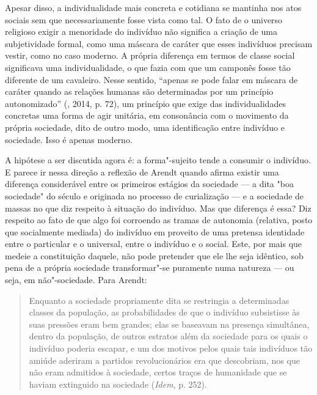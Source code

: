 Apesar disso, a individualidade mais concreta e cotidiana se mantinha
nos atos sociais sem que necessariamente fosse vista como tal. O fato de
o universo religioso exigir a menoridade do indivíduo não significa a
criação de uma subjetividade formal, como uma máscara de caráter que
esses indivíduos precisam vestir, como no caso moderno. A própria
diferença em termos de classe social significava uma individualidade, o
que fazia com que um camponês fosse tão diferente de um cavaleiro. Nesse
sentido, ``apenas se pode falar em máscara de caráter quando as relações
humanas são determinadas por um princípio autonomizado'' (, 2014, p.
72), um princípio que exige das individualidades concretas uma forma de
agir unitária, em consonância com o movimento da própria sociedade, dito
de outro modo, uma identificação entre indivíduo e sociedade. Isso é
apenas moderno.

A hipótese a ser discutida agora é: a
forma"-sujeito tende a consumir o indivíduo. E parece ir nessa direção a
reflexão de Arendt quando afirma existir uma diferença considerável
entre os primeiros estágios da sociedade --- a dita "boa sociedade" do século
 e  originada no processo de curialização ---
e a sociedade de massas no que diz respeito à situação do indivíduo. Mas que
diferença é essa? Diz respeito ao fato de que algo foi corroendo as tramas de
autonomia (relativa, posto que socialmente mediada) do indivíduo em
proveito de uma pretensa identidade entre o particular e o universal,
entre o indivíduo e o social. Este, por mais que medeie a constituição
daquele, não pode pretender que ele lhe seja idêntico, sob pena de a
própria sociedade transformar"-se puramente numa natureza --- ou seja, em
não"-sociedade. Para Arendt:

\begin{quote}
Enquanto a sociedade propriamente dita se restringia a determinadas
classes da população, as probabilidades de que o indivíduo subsistisse
às suas pressões eram bem grandes; elas se baseavam na presença
simultânea, dentro da população, de outros estratos além da sociedade
para os quais o indivíduo poderia escapar, e um dos motivos pelos quais
tais indivíduos tão amiúde aderiram a partidos revolucionários era que
descobriam, nos que não eram admitidos à sociedade, certos traços de
humanidade que se haviam extinguido na sociedade (\emph{Idem}, p. 252).
\end{quote}

